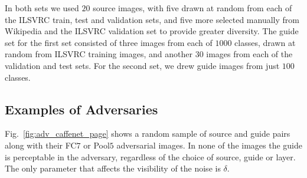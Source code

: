 \documentclass{article} %
\begin{document}
In both sets we used $20$ source images, with five drawn at random from each of 
the ILSVRC train, test and validation sets, and five more selected manually 
from Wikipedia and the ILSVRC validation set to provide greater diversity.  The 
guide set for the first set consisted of three images from each of $1000$
classes, drawn at random from ILSVRC training images, and another $30$ images 
from each of the validation and test sets. For the second set, we drew guide 
images from just $100$ classes.

\subsection{Examples of Adversaries}
Fig.~\ref{fig:adv_caffenet_page} shows a random sample of source and guide 
pairs along with their FC$7$ or Pool$5$ adversarial images. In none of the images the guide is perceptable in the adversary, regardless of the 
choice of source, guide or layer. The only parameter that affects the 
visibility of the noise is $\delta$.
\end{document}
